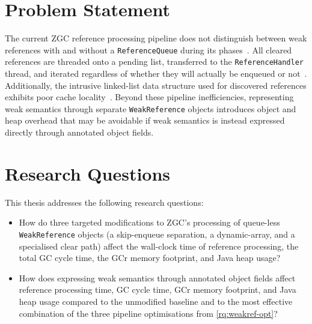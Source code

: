     \section{Problem Statement}
    \label{sec:intro-problem}

        The current \ac{ZGC} reference processing pipeline does not distinguish between weak references with and without a \texttt{ReferenceQueue} during its phases~\cite{openjdk-zreferenceprocessor-cpp}. All cleared references are threaded onto a pending list, transferred to the \texttt{ReferenceHandler} thread, and iterated regardless of whether they will actually be enqueued or not~\cite{openjdk-reference-java}. Additionally, the intrusive linked-list data structure used for discovered references exhibits poor cache locality~\cite{drepper07-memory}. Beyond these pipeline inefficiencies, representing weak semantics through separate \texttt{WeakReference} objects introduces object and heap overhead that may be avoidable if weak semantics is instead expressed directly through annotated object fields.

    \section{Research Questions}
    \label{sec:intro-rqs}
        This thesis addresses the following research questions:
        \begin{itemize}
            \item[\textbf{RQ1}] \label{rq:weakref-opt} How do three targeted modifications to \ac{ZGC}'s processing of queue-less \texttt{WeakReference} objects (a skip-enqueue separation, a dynamic-array, and a specialised clear path) affect the wall-clock time of reference processing, the total \ac{GC} cycle time, the \ac{GCr} memory footprint, and Java heap usage?
            \item[\textbf{RQ2}] \label{rq:weak-fields} How does expressing weak semantics through annotated object fields affect reference processing time, \ac{GC} cycle time, \ac{GCr} memory footprint, and Java heap usage compared to the unmodified baseline and to the most effective combination of the three pipeline optimisations from \cref{rq:weakref-opt}?
        \end{itemize}


